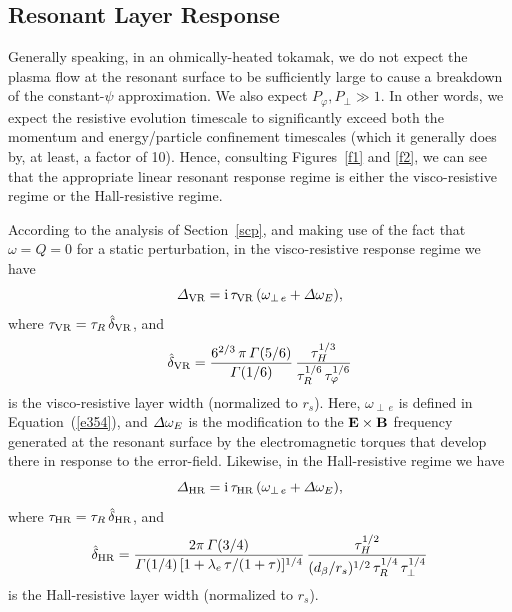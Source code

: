 \documentclass[notitlepage,12pt]{article}
\begin{document}
\subsection{Resonant Layer Response}
Generally speaking, in an ohmically-heated tokamak, we do not expect the plasma flow at the resonant surface to be sufficiently
large to cause a breakdown of the constant-$\psi$ approximation. We also expect $P_\varphi, P_\perp \gg 1$. In other
words, we expect the resistive evolution timescale to significantly exceed both the momentum and energy/particle
confinement timescales (which it generally does by, at least, a factor of 10). Hence, consulting Figures~\ref{f1} and \ref{f2},
we can see that the appropriate linear resonant response regime is either the visco-resistive regime or the Hall-resistive
regime. 

According to the analysis of Section~\ref{scp}, and making use of the fact that $\omega=Q=0$ for a static perturbation, 
in the visco-resistive response regime we have
\begin{equation}
{\mit\Delta}_{\rm VR} = {\rm i}\,\tau_{\rm VR}\,(\omega_{\perp\,e}+{\mit\Delta}\omega_E),
\end{equation}
where $\tau_{\rm VR} = \tau_R\,\hat{\delta}_{\rm VR}$, and
\begin{equation}
\hat{\delta}_{\rm VR} = \frac{6^{2/3}\,\pi\,{\mit\Gamma}(5/6)}{{\mit\Gamma}(1/6)}\,\frac{\tau_H^{1/3}}{\tau_R^{1/6}\,\tau_\varphi^{1/6}}
\end{equation}
is the visco-resistive layer width (normalized to $r_s$). Here, $\omega_{\perp\,e}$ is defined in Equation~(\ref{e354}), and
${\mit\Delta}\omega_E$ is the modification to the ${\bf E}\times{\bf B}$ frequency generated at the resonant surface by
the electromagnetic torques that develop there in response to the error-field. Likewise, in the
Hall-resistive regime we have
\begin{equation}
{\mit\Delta}_{\rm HR} = {\rm i}\,\tau_{\rm HR}\,(\omega_{\perp\,e}+{\mit\Delta}\omega_E),
\end{equation}
where $\tau_{\rm HR} = \tau_R\,\hat{\delta}_{\rm HR}$, and
\begin{equation}
\hat{\delta}_{\rm HR} = \frac{2\pi\,{\mit\Gamma}(3/4)}{{\mit\Gamma}(1/4)\,[1+\lambda_e\,\tau/(1+\tau)]^{1/4}}\,
\frac{\tau_H^{1/2}}{(d_\beta/r_s)^{1/2}\,\tau_R^{1/4}\,\tau_\perp^{1/4}}
\end{equation}
is the Hall-resistive layer width (normalized to $r_s$).
\end{document}
